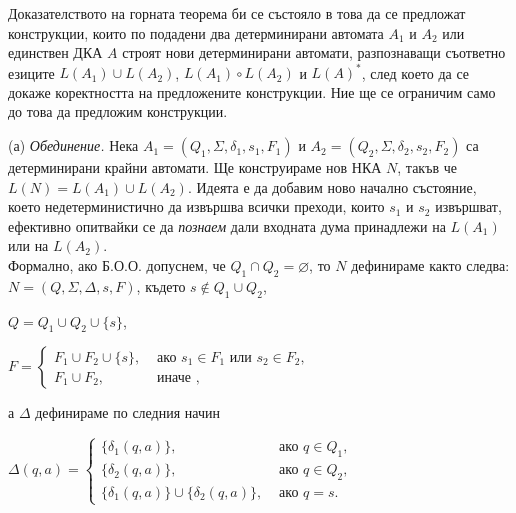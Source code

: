 \documentclass[openany]{book}
\begin{document}
         \vspace{15pt}
    
         Доказателството на горната теорема би се състояло в това да се предложат конструкции,
         които по подадени два детерминирани автомата $A_1$ и $A_2$ или единствен ДКА
         $A$ строят нови детерминирани автомати, разпознаващи съответно езиците 
         $L(A_1) \cup L(A_2)$, $L(A_1) \circ L(A_2)$ и $L(A)^*$, след което да се докаже 
         коректността на предложените конструкции. Ние ще се ограничим само до това да 
         предложим конструкции.
    
         \vspace{15pt}
         
         (а) \textit{Обединение.} Нека $A_1 = (Q_1,\Sigma,\delta_1,s_1,F_1)$ и 
         $A_2 = (Q_2,\Sigma,\delta_2,s_2,F_2)$ са детерминирани крайни автомати. Ще
         конструираме нов НКА $N$, такъв че $L(N) = L(A_1) \cup L(A_2)$. Идеята е да
         добавим ново начално състояние, което недетерминистично да извършва всички преходи,
         които $s_1$ и $s_2$ извършват, ефективно опитвайки се да \textit{познаем} 
         дали входната дума принадлежи на $L(A_1)$ или на $L(A_2)$. \\
         \hspace{15pt} Формално, ако Б.О.О.
         допуснем, че $Q_1 \cap Q_2 = \varnothing$, то $N$ дефинираме както следва:
         $N = (Q,\Sigma,\Delta,s,F)$, където $s \notin Q_1 \cup Q_2$,
         \begin{center}
            $Q = Q_1 \cup Q_2 \cup \{s\}$, \\
         \end{center}
    
         \begin{center}
         $F = 
         \begin{cases}
          F_1 \cup F_2 \cup \{s\}, & \text { ако } s_1 \in F_1 \text { или } s_2 \in F_2, \\
          F_1 \cup F_2, & \text { иначе },
        \end{cases}$
        \end{center}      
        
         а $\Delta$ дефинираме по следния начин
    
         \begin{center}
            $\Delta(q,a) =
            \begin{cases}
              \{\delta_1(q,a)\}, & \text { ако } q \in Q_1, \\
              \{\delta_2(q,a)\}, & \text { ако } q \in Q_2, \\
              \{\delta_1(q,a)\} \cup \{\delta_2(q,a)\}, & \text { ако } q = s.
            \end{cases}$
         \end{center}
    
\end{document}
